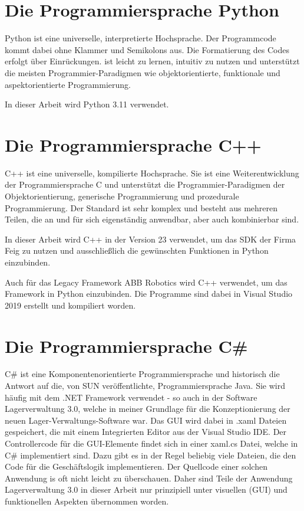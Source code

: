 \section{Die Programmiersprache Python}

Python ist eine universelle, interpretierte Hochsprache. Der Programmcode kommt dabei ohne Klammer und Semikolons aus.
Die Formatierung des Codes erfolgt über Einrückungen. \cite[Python]{Python} ist leicht zu lernen, intuitiv zu nutzen und unterstützt die 
meisten Programmier-Paradigmen wie objektorientierte, funktionale und aspektorientierte Programmierung. 

In dieser Arbeit wird Python 3.11 verwendet. 

\section{Die Programmiersprache C++}

C++ ist eine universelle, kompilierte Hochsprache. Sie ist eine Weiterentwicklung der Programmiersprache C und unterstützt die
Programmier-Paradigmen der Objektorientierung, generische Programmierung und prozedurale Programmierung.
Der Standard ist sehr komplex und besteht aus mehreren Teilen, die an und für sich eigenständig anwendbar, aber auch kombinierbar sind.

In dieser Arbeit wird C++ in der Version 23 verwendet, um das SDK der Firma Feig zu nutzen und ausschließlich die gewünschten Funktionen 
in Python einzubinden.

Auch für das Legacy Framework ABB Robotics wird C++ verwendet, um das Framework in Python einzubinden.
Die Programme sind dabei in Visual Studio 2019 erstellt und kompiliert worden. 

\section{Die Programmiersprache C\#}\label{Csharp}

C$\#$ ist eine Komponentenorientierte Programmiersprache und historisch die Antwort auf die, von SUN veröffentlichte, Programmiersprache Java. 
Sie wird häufig mit dem .NET Framework verwendet - so auch in der Software Lagerverwaltung 3.0, welche in meiner \cite[Semesterarbeit]{Semesterarbeit}
Grundlage für die Konzeptionierung der neuen Lager-Verwaltungs-Software war. 
Das GUI wird dabei in .xaml Dateien gespeichert, die mit einem Integrierten Editor aus der Visual Studio IDE. Der Controllercode für die GUI-Elemente 
findet sich in einer xaml.cs Datei, welche in C$\#$ implementiert sind.
Dazu gibt es in der Regel beliebig viele Dateien, die den Code für die Geschäftslogik implementieren. Der Quellcode einer solchen Anwendung is oft nicht leicht zu überschauen. 
Daher sind Teile der Anwendung Lagerverwaltung 3.0 in dieser Arbeit nur prinzipiell unter visuellen (GUI) und funktionellen Aspekten übernommen worden.

